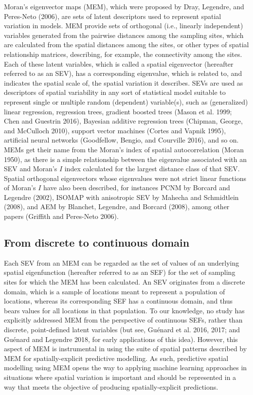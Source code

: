 \documentclass[
]{article}
\begin{document}
Moran's eigenvector maps (MEM), which were proposed by Dray, Legendre,
and Peres-Neto (2006), are sets of latent descriptors used to represent
spatial variation in models. MEM provide sets of orthogonal (i.e.,
linearly independent) variables generated from the pairwise distances
among the sampling sites, which are calculated from the spatial
distances among the sites, or other types of spatial relationship
matrices, describing, for example, the connectivity among the sites.
Each of these latent variables, which is called a spatial eigenvector
(hereafter referred to as an SEV), has a corresponding eigenvalue, which
is related to, and indicates the spatial scale of, the spatial variation
it describes. SEVs are used as descriptors of spatial variability in any
sort of statistical model suitable to represent single or multiple
random (dependent) variable(s), such as (generalized) linear regression,
regression trees, gradient boosted trees (Mason et al. 1999; Chen and
Guestrin 2016), Bayesian additive regression trees (Chipman, George, and
McCulloch 2010), support vector machines (Cortes and Vapnik 1995),
artificial neural networks (Goodfellow, Bengio, and Courville 2016), and
so on. MEMs get their name from the Moran's index of spatial
autocorrelation (Moran 1950), as there is a simple relationship between
the eigenvalue associated with an SEV and Moran's \(I\) index calculated
for the largest distance class of that SEV. Spatial orthogonal
eigenvectors whose eigenvalues were not strict linear functions of
Moran's \(I\) have also been described, for instances PCNM by Borcard
and Legendre (2002), ISOMAP with anisotropic SEV by Mahecha and
Schmidtlein (2008), and AEM by Blanchet, Legendre, and Borcard (2008),
among other papers (Griffith and Peres-Neto 2006).

\subsection{From discrete to continuous
domain}\label{from-discrete-to-continuous-domain}

Each SEV from an MEM can be regarded as the set of values of an
underlying spatial eigenfunction (hereafter referred to as an SEF) for
the set of sampling sites for which the MEM has been calculated. An SEV
originates from a discrete domain, which is a sample of locations meant
to represent a population of locations, whereas its corresponding SEF
has a continuous domain, and thus bears values for all locations in that
population. To our knowledge, no study has explicitly addressed MEM from
the perspective of continuous SEFs, rather than discrete, point-defined
latent variables (but see, Guénard et al. 2016, 2017; and Guénard and
Legendre 2018, for early applications of this idea). However, this
aspect of MEM is instrumental in using the suite of spatial patterns
described by MEM for spatially-explicit predictive modelling. As such,
predictive spatial modelling using MEM opens the way to applying machine
learning approaches in situations where spatial variation is important
and should be represented in a way that meets the objective of producing
spatially-explicit predictions.
\end{document}
